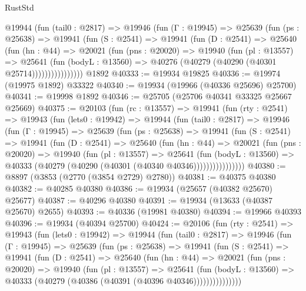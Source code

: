 \begin{lexlean}{RustStd}
\begin{coremodule}
          @19944
            (fun (tail0 : @2817) =>
            @19946
              (fun (Γ : @19945) =>
              @25639
                (fun (ps : @25638) =>
                @19941
                  (fun (S : @2541) =>
                  @19941
                    (fun (D : @2541) =>
                    @25640
                      (fun (hn : @44) =>
                      @20021
                        (fun (pns : @20020) =>
                        @19940
                          (fun (pl : @13557) =>
                          @25641
                            (fun (bodyL : @13560) =>
                            @40276 (@40279 (@40290 (@40301 @25714))))))))))))))))
    @1892
@40333 := @19934 @19825
@40336 := @19974 (@19975 @1892) @33322
@40340 := @19934 (@19966 (@40336 @25696) @25700)
@40341 := @19998 @1892
@40346 := @25705 (@25706 @40341 @33325 @25667 @25669)
@40375 := @20103
    (fun (rc : @13557) =>
    @19941
      (fun (rty : @2541) =>
      @19943
        (fun (lets0 : @19942) =>
        @19944
          (fun (tail0 : @2817) =>
          @19946
            (fun (Γ : @19945) =>
            @25639
              (fun (ps : @25638) =>
              @19941
                (fun (S : @2541) =>
                @19941
                  (fun (D : @2541) =>
                  @25640
                    (fun (hn : @44) =>
                    @20021
                      (fun (pns : @20020) =>
                      @19940
                        (fun (pl : @13557) =>
                        @25641
                          (fun (bodyL : @13560) =>
                          @40333 (@40279 (@40290 (@40301 (@40340 @40346))))))))))))))))
@40380 := @8897 (@3853 (@2770 (@3854 @2729) @2780))
@40381 := @40375 @40380
@40382 := @40285 @40380
@40386 := @19934 (@25657 (@40382 @25670) @25677)
@40387 := @40296 @40380
@40391 := @19934 (@13633 (@40387 @25670) @2655)
@40393 := @40336 (@19981 @40380)
@40394 := @19966 @40393
@40396 := @19934 (@40394 @25700)
@40424 := @20106
    (fun (rty : @2541) =>
    @19943
      (fun (lets0 : @19942) =>
      @19944
        (fun (tail0 : @2817) =>
        @19946
          (fun (Γ : @19945) =>
          @25639
            (fun (ps : @25638) =>
            @19941
              (fun (S : @2541) =>
              @19941
                (fun (D : @2541) =>
                @25640
                  (fun (hn : @44) =>
                  @20021
                    (fun (pns : @20020) =>
                    @19940
                      (fun (pl : @13557) =>
                      @25641
                        (fun (bodyL : @13560) =>
                        @40333 (@40279 (@40386 (@40391 (@40396 @40346)))))))))))))))

\end{coremodule}
\end{lexlean}
